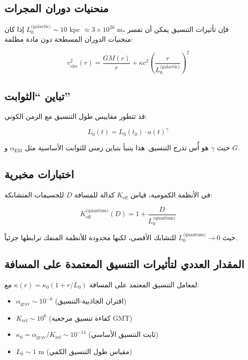 \documentclass[11pt,a4paper]{article}
\begin{document}
	\subsection{منحنيات دوران المجرات}
	
	إذا كان $L_0^{\text{(galactic)}} \sim 10$ kpc $\approx 3\times10^{20}$ m، فإن تأثيرات التنسيق يمكن أن تفسر منحنيات الدوران المسطحة دون مادة مظلمة:
	
	\begin{equation}
		v_{\text{circ}}^2(r) = \frac{GM(r)}{r} + \kappa c^2 \left(\frac{r}{L_0^{\text{(galactic)}}}\right)^2
	\end{equation}
	
	\subsection{تباين ``الثوابت''}
	
	قد تتطور مقاييس طول التنسيق مع الزمن الكوني:
	
	\begin{equation}
		L_0(t) = L_0(t_0) \cdot a(t)^\gamma
	\end{equation}
	
	حيث $\gamma$ هو أُس تدرج التنسيق. هذا يتنبأ بتباين زمني للثوابت الأساسية مثل $\alpha_{\text{EM}}$ و $G$.
	
	\subsection{اختبارات مخبرية}
	
	في الأنظمة الكمومية، قياس $K_{\mathrm{eff}}$ كدالة للمسافة $D$ للجسيمات المتشابكة:
	
	\begin{equation}
		K_{\mathrm{eff}}^{\text{(quantum)}}(D) = 1 + \frac{D}{L_0^{\text{(quantum)}}}
	\end{equation}
	
	حيث $L_0^{\text{(quantum)}} \to 0$ للتشابك الأقصى، لكنها محدودة للأنظمة المنفك ترابطها جزئياً.
	
	\subsection{المقدار العددي لتأثيرات التنسيق المعتمدة على المسافة}
	\label{subsec:numerical-magnitudes}
	
	لمعامل التنسيق المعتمد على المسافة $\kappa(r) = \kappa_0(1 + r/L_0)$ مع:
	\begin{itemize}
		\item $\alpha_{\text{grav}} \sim 10^{-8}$ (اقتران الجاذبية-التنسيق)
		\item $K_{\text{ref}} \sim 10^6$ (كفاءة تنسيق مرجعية GMT)
		\item $\kappa_0 = \alpha_{\text{grav}}/K_{\text{ref}} \sim 10^{-14}$ (ثابت التنسيق الأساسي)
		\item $L_0 \sim 1$ m (مقياس طول التنسيق الكمي)
	\end{itemize}
	
\end{document}
